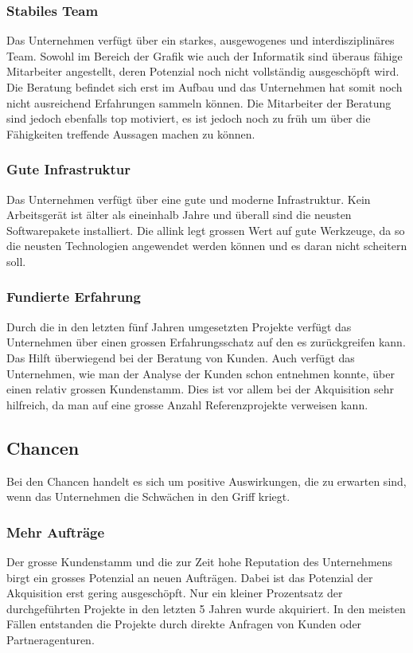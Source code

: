 \subsubsection{Stabiles Team}
Das Unternehmen verfügt über ein starkes, ausgewogenes und interdisziplinäres Team. 
Sowohl im Bereich der Grafik wie auch der Informatik sind überaus fähige Mitarbeiter 
angestellt, deren Potenzial noch nicht vollständig ausgeschöpft wird. Die Beratung
befindet sich erst im Aufbau und das Unternehmen hat somit noch nicht ausreichend
Erfahrungen sammeln können. Die Mitarbeiter der Beratung sind jedoch ebenfalls
top motiviert, es ist jedoch noch zu früh um über die Fähigkeiten treffende
Aussagen machen zu können.

\subsubsection{Gute Infrastruktur}
Das Unternehmen verfügt über eine gute und moderne Infrastruktur. Kein Arbeitsgerät
ist älter als eineinhalb Jahre und überall sind die neusten Softwarepakete installiert.
Die allink legt grossen Wert auf gute Werkzeuge, da so die neusten Technologien
angewendet werden können und es daran nicht scheitern soll.

\subsubsection{Fundierte Erfahrung}
Durch die in den letzten fünf Jahren umgesetzten Projekte verfügt das Unternehmen
über einen grossen Erfahrungsschatz auf den es zurückgreifen kann. Das Hilft
überwiegend bei der Beratung von Kunden.
Auch verfügt das Unternehmen, wie man der Analyse der Kunden schon entnehmen
konnte, über einen relativ grossen Kundenstamm. Dies ist vor allem bei der
Akquisition sehr hilfreich, da man auf eine grosse Anzahl Referenzprojekte 
verweisen kann.

\subsection{Chancen}
Bei den Chancen handelt es sich um positive Auswirkungen, die zu erwarten sind,
wenn das Unternehmen die Schwächen in den Griff kriegt.

\subsubsection{Mehr Aufträge}
Der grosse Kundenstamm und die zur Zeit hohe Reputation des Unternehmens
birgt ein grosses Potenzial an neuen Aufträgen. Dabei ist das Potenzial der
Akquisition erst gering ausgeschöpft. Nur ein kleiner Prozentsatz der durchgeführten
Projekte in den letzten 5 Jahren wurde akquiriert. In den meisten Fällen entstanden
die Projekte durch direkte Anfragen von Kunden oder Partneragenturen.

